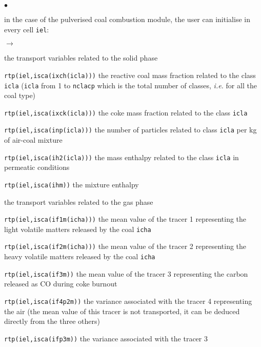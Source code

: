 {{\begin{list}{$\bullet$}{}
        \item in the case of the pulverised coal combustion module, the
             user can initialise in every cell \texttt{iel}:
              \begin{list}{$\rightarrow$}{}
                     \item the transport variables related to the solid phase
                           \begin{list}{}{}
                                  \item \texttt{rtp(iel,isca(ixch(icla)))} the reactive coal mass fraction related to the class \texttt{icla} (\texttt{icla} from 1 to \texttt{nclacp} which is the total number of classes, {\em i.e.} for all the coal type)
                                  \item \texttt{rtp(iel,isca(ixck(icla)))} the coke mass fraction related to the class \texttt{icla}
                                  \item        \texttt{rtp(iel,isca(inp(icla)))} the number of particles related to class \texttt{icla} per kg of air-coal mixture
                                  \item \texttt{rtp(iel,isca(ih2(icla)))} the mass enthalpy related to the class \texttt{icla} in permeatic conditions
                           \end{list}
                     \item \texttt{rtp(iel,isca(ihm))} the mixture enthalpy
                     \item the transport variables related to the gas phase
                           \begin{list}{}{}
                                  \item
                                       \texttt{rtp(iel,isca(if1m(icha)))} the mean value of the tracer 1 representing the light volatile matters released by the coal \texttt{icha}
                                  \item
                                       \texttt{rtp(iel,isca(if2m(icha)))} the mean value of the tracer 2 representing the heavy volatile matters released by the coal \texttt{icha}
                                  \item \texttt{rtp(iel,isca(if3m))}
                                        the mean value of the tracer 3
                                        representing the carbon released
                                        as CO during coke burnout
                                  \item \texttt{rtp(iel,isca(if4p2m))} the variance associated with the tracer 4 representing the air (the mean value of this tracer is not transported, it can be deduced directly from the three others)
                                  \item \texttt{rtp(iel,isca(ifp3m))} the variance associated with the tracer 3
                           \end{list}
              \end{list}
\end{list}

}}
